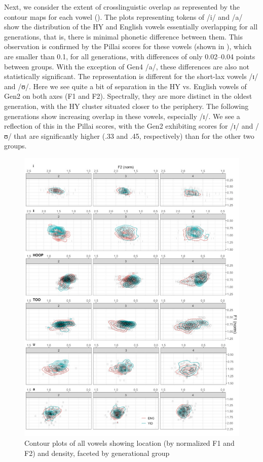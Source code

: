 \documentclass[output=paper]{langsci/langscibook}
\begin{document}
Next, we consider the extent of crosslinguistic overlap as represented by the contour maps for each vowel (). The plots representing tokens of /i/ and /a/ show the distribution of the HY and English vowels essentially overlapping for all generations, that is, there is minimal phonetic difference between them. This observation is confirmed by the Pillai scores for these vowels (shown in ), which are smaller than 0.1, for all generations, with differences of only 0.02--0.04 points between groups. With the exception of Gen4 /a/, these differences are also not statistically significant. The representation is different for the short-lax vowels /ɪ/ and /ʊ/. Here we see quite a bit of separation in the HY vs. English vowels of Gen2 on both axes (F1 and F2). Spectrally, they are more distinct in the oldest generation, with the HY cluster situated closer to the periphery. The following generations show increasing overlap in these vowels, especially /ɪ/. We see a reflection of this in the Pillai scores, with the Gen2 exhibiting scores for /ɪ/ and /ʊ/ that are significantly higher (.33 and .45, respectively) than for the other two groups.


\begin{figure}
\includegraphics[width=\textwidth]{figures/nove-fig8-color.pdf}
\caption{Contour plots of all vowels showing location (by normalized F1 and F2) and density, faceted by generational group}
\label{fig:nove:8}
\end{figure}
\end{document}

